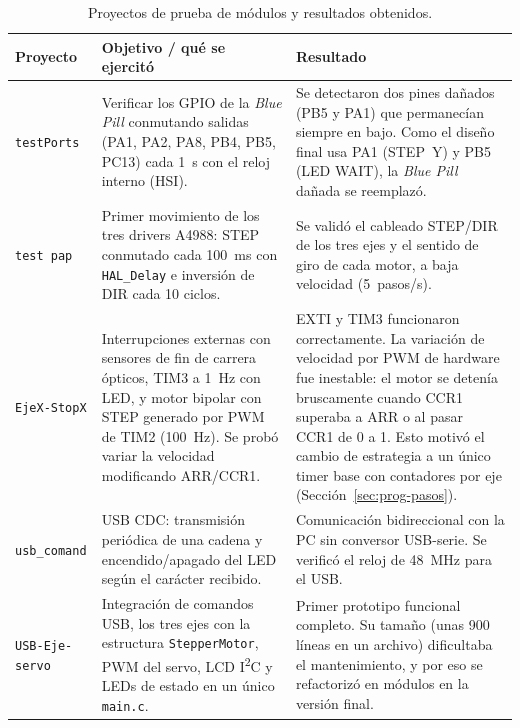 \begin{table}[H]
\centering\small
\caption{Proyectos de prueba de módulos y resultados obtenidos.}\label{tab:pruebas-modulos}
\begin{tabularx}{\textwidth}{@{}p{2.5cm} X X@{}}
\toprule
\textbf{Proyecto} & \textbf{Objetivo / qué se ejercitó} & \textbf{Resultado}\\
\midrule
\texttt{testPorts} &
Verificar los GPIO de la \emph{Blue Pill} conmutando salidas (PA1, PA2, PA8, PB4, PB5, PC13) cada \SI{1}{\second} con el reloj interno (HSI). &
Se detectaron dos pines dañados (PB5 y PA1) que permanecían siempre en bajo. Como el diseño final usa PA1 (STEP~Y) y PB5 (LED WAIT), la \emph{Blue Pill} dañada se reemplazó.\\
\texttt{test pap} &
Primer movimiento de los tres drivers A4988: STEP conmutado cada \SI{100}{\milli\second} con \texttt{HAL\_Delay} e inversión de DIR cada 10 ciclos. &
Se validó el cableado STEP/DIR de los tres ejes y el sentido de giro de cada motor, a baja velocidad (\SI{5}{pasos/s}).\\
\texttt{EjeX-StopX} &
Interrupciones externas con sensores de fin de carrera ópticos, TIM3 a \SI{1}{\hertz} con LED, y motor bipolar con STEP generado por PWM de TIM2 (\SI{100}{\hertz}). Se probó variar la velocidad modificando ARR/CCR1. &
EXTI y TIM3 funcionaron correctamente. La variación de velocidad por PWM de hardware fue inestable: el motor se detenía bruscamente cuando CCR1 superaba a ARR o al pasar CCR1 de 0 a 1. Esto motivó el cambio de estrategia a un único timer base con contadores por eje (Sección~\ref{sec:prog-pasos}).\\
\texttt{usb\_comand} &
USB CDC: transmisión periódica de una cadena y encendido/apagado del LED según el carácter recibido. &
Comunicación bidireccional con la PC sin conversor USB-serie. Se verificó el reloj de \SI{48}{\mega\hertz} para el USB.\\
\texttt{USB-Eje-servo} &
Integración de comandos USB, los tres ejes con la estructura \texttt{StepperMotor}, PWM del servo, LCD I\textsuperscript{2}C y LEDs de estado en un único \texttt{main.c}. &
Primer prototipo funcional completo. Su tamaño (unas 900 líneas en un archivo) dificultaba el mantenimiento, y por eso se refactorizó en módulos en la versión final.\\
\bottomrule
\end{tabularx}
\end{table}


